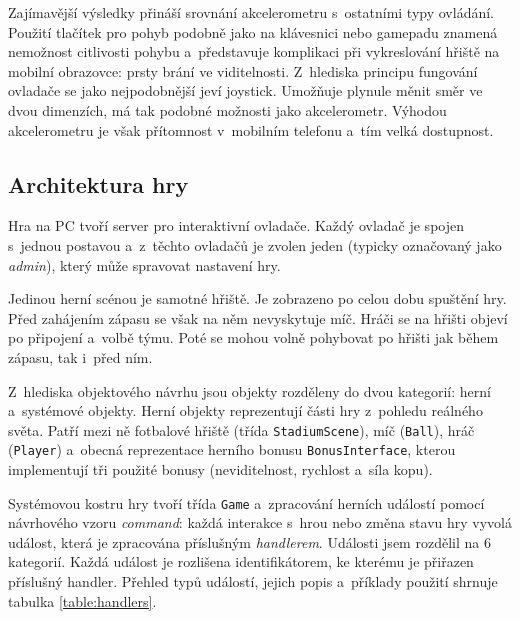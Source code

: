\documentclass[thesis=B,czech,hidelinks]{FITthesis}[2012/06/26] %
\newcommand{\code}[1]{\texttt{#1}}
\begin{document}
Zajímavější výsledky přináší srovnání akcelerometru s~ostatními typy ovládání. Použití tlačítek pro pohyb podobně jako na klávesnici nebo gamepadu znamená nemožnost citlivosti pohybu a~představuje komplikaci při vykreslování hřiště na mobilní obrazovce: prsty brání ve viditelnosti. Z~hlediska principu fungování ovladače se jako nejpodobnější jeví joystick. Umožňuje plynule měnit směr ve dvou dimenzích, má tak podobné možnosti jako akcelerometr. Výhodou akcelerometru je však přítomnost v~mobilním telefonu a~tím velká dostupnost.

\subsection{Architektura hry}

Hra na PC tvoří server pro interaktivní ovladače. Každý ovladač je spojen s~jednou postavou a~z~těchto ovladačů je zvolen jeden (typicky označovaný jako \textit{admin}), který může spravovat nastavení hry.

Jedinou herní scénou je samotné hřiště. Je zobrazeno po celou dobu spuštění hry. Před zahájením zápasu se však na něm nevyskytuje míč. Hráči se na hřišti objeví po připojení a~volbě týmu. Poté se mohou volně pohybovat po hřišti jak během zápasu, tak i~před ním. 

Z~hlediska objektového návrhu jsou objekty rozděleny do dvou kategorií: herní a~systémové objekty. Herní objekty reprezentují části hry z~pohledu reálného světa. Patří mezi ně fotbalové hřiště (třída \code{StadiumScene}), míč (\code{Ball}), hráč (\code{Player}) a~obecná reprezentace herního bonusu \code{BonusInterface}, kterou implementují tři použité bonusy (neviditelnost, rychlost a~síla kopu). 

Systémovou kostru hry tvoří třída \code{Game} a~zpracování herních událostí pomocí návrhového vzoru \emph{command}\cite{patterns}: každá interakce s~hrou nebo změna stavu hry vyvolá událost, která je zpracována příslušným \textit{handlerem}. Události jsem rozdělil na 6 kategorií. Každá událost je rozlišena identifikátorem, ke kterému je přiřazen příslušný handler. Přehled typů událostí, jejich popis a~příklady použití shrnuje tabulka \ref{table:handlers}.
\end{document}
